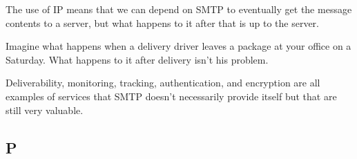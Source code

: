 \documentclass[12pt,titlepage]{article}
\begin{document}
The use of IP means that we can depend on SMTP to eventually get the message contents to a server, but what happens to it after that is up to the server.

Imagine what happens when a delivery driver leaves a package at your office on a Saturday. What happens to it after delivery isn’t his problem.

Deliverability, monitoring, tracking, authentication, and encryption are all examples of services that SMTP doesn’t necessarily provide itself but that are still very valuable.

\subsection{P}
\end{document}

